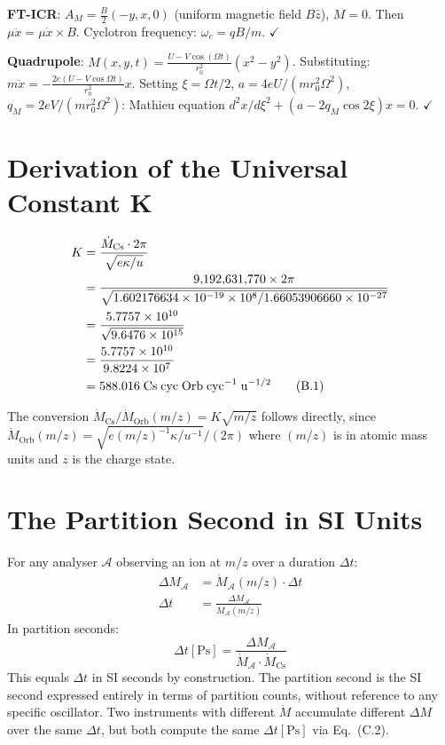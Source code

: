 \documentclass[11pt,twocolumn,a4paper]{article}
\theoremstyle{plain}
\theoremstyle{definition}
\theoremstyle{remark}
\newcommand{\Cs}{\mathrm{Cs}}
\newcommand{\Orb}{\mathrm{Orb}}
\begin{document}
\textbf{FT-ICR}: $A_M = \frac{B}{2}(-y, x, 0)$ (uniform magnetic field
$B\hat{z}$), $M = 0$. Then $\mu\ddot{x} = \mu\dot{x} \times B$. Cyclotron
frequency: $\omega_c = qB/m$. $\checkmark$

\textbf{Quadrupole}: $M(x,y,t) = \frac{U - V\cos(\Omega t)}{r_0^2}(x^2 - y^2)$.
Substituting: $m\ddot{x} = -\frac{2e(U - V\cos\Omega t)}{r_0^2}x$. Setting
$\xi = \Omega t/2$, $a = 4eU/(mr_0^2\Omega^2)$, $q_M = 2eV/(mr_0^2\Omega^2)$:
Mathieu equation $d^2x/d\xi^2 + (a - 2q_M\cos 2\xi)x = 0$. $\checkmark$

\section{Derivation of the Universal Constant K}
\label{app:K_derivation}

\begin{align}
    K &= \frac{\dot{M}_{\Cs} \cdot 2\pi}{\sqrt{e\kappa/u}} \notag \\
      &= \frac{9{,}192{,}631{,}770 \times 2\pi}{\sqrt{1.602176634\times10^{-19}
         \times 10^8 / 1.66053906660\times10^{-27}}} \notag \\
      &= \frac{5.7757 \times 10^{10}}{\sqrt{9.6476 \times 10^{15}}} \notag \\
      &= \frac{5.7757 \times 10^{10}}{9.8224 \times 10^7} \notag \\
      &= 588.016 \;\mathrm{Cs\;cyc\;Orb\;cyc}^{-1}\;\mathrm{u}^{-1/2}
    \tag{B.1}
\end{align}

The conversion $\dot{M}_{\Cs}/\dot{M}_{\Orb}(m/z) = K\sqrt{m/z}$ follows
directly, since $\dot{M}_{\Orb}(m/z) = \sqrt{e(m/z)^{-1}\kappa/u^{-1}}/(2\pi)$
where $(m/z)$ is in atomic mass units and $z$ is the charge state.

\section{The Partition Second in SI Units}
\label{app:partition_second}

For any analyser $\mathcal{A}$ observing an ion at $m/z$ over a duration $\Delta t$:
\begin{align}
    \Delta M_{\mathcal{A}} &= \dot{M}_{\mathcal{A}}(m/z) \cdot \Delta t \tag{C.1}\\
    \Delta t &= \frac{\Delta M_{\mathcal{A}}}{\dot{M}_{\mathcal{A}}(m/z)} \tag{C.2}
\end{align}
In partition seconds:
\begin{equation}
    \Delta t [\mathrm{Ps}] = \frac{\Delta M_{\mathcal{A}}}{\dot{M}_{\mathcal{A}}
    \cdot \dot{M}_{\Cs}} \tag{C.3}
\end{equation}
This equals $\Delta t$ in SI seconds by construction. The partition second is
the SI second expressed entirely in terms of partition counts, without reference
to any specific oscillator. Two instruments with different $\dot{M}$ accumulate
different $\Delta M$ over the same $\Delta t$, but both compute the same
$\Delta t [\mathrm{Ps}]$ via Eq.~(C.2).




\end{document}

